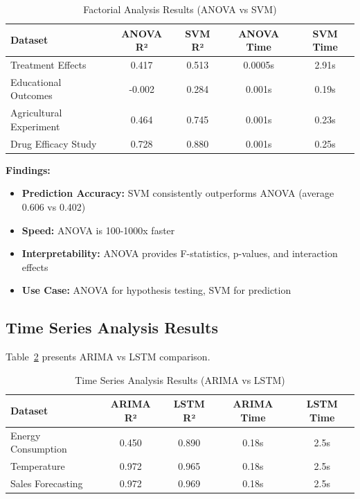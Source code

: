 \documentclass[11pt,a4paper]{article}
\begin{document}
\begin{table}[h]
\centering
\begin{tabular}{lcccc}
\toprule
\textbf{Dataset} & \textbf{ANOVA R²} & \textbf{SVM R²} & \textbf{ANOVA Time} & \textbf{SVM Time} \\
\midrule
Treatment Effects & 0.417 & \textcolor{mlcolor}{0.513} & 0.0005s & 2.91s \\
Educational Outcomes & -0.002 & \textcolor{mlcolor}{0.284} & 0.001s & 0.19s \\
Agricultural Experiment & 0.464 & \textcolor{mlcolor}{0.745} & 0.001s & 0.23s \\
Drug Efficacy Study & 0.728 & \textcolor{mlcolor}{0.880} & 0.001s & 0.25s \\
\bottomrule
\end{tabular}
\caption{Factorial Analysis Results (ANOVA vs SVM)}
\label{tab:factorial_results}
\end{table}

\textbf{Findings:}
\begin{itemize}
    \item \textbf{Prediction Accuracy:} SVM consistently outperforms ANOVA (average 0.606 vs 0.402)
    \item \textbf{Speed:} ANOVA is 100-1000x faster
    \item \textbf{Interpretability:} ANOVA provides F-statistics, p-values, and interaction effects
    \item \textbf{Use Case:} ANOVA for hypothesis testing, SVM for prediction
\end{itemize}

\subsection{Time Series Analysis Results}

Table~\ref{tab:timeseries_results} presents ARIMA vs LSTM comparison.

\begin{table}[h]
\centering
\begin{tabular}{lcccc}
\toprule
\textbf{Dataset} & \textbf{ARIMA R²} & \textbf{LSTM R²} & \textbf{ARIMA Time} & \textbf{LSTM Time} \\
\midrule
Energy Consumption & 0.450 & \textcolor{dlcolor}{0.890} & 0.18s & 2.5s \\
Temperature & \textcolor{statcolor}{0.972} & 0.965 & 0.18s & 2.5s \\
Sales Forecasting & \textcolor{statcolor}{0.972} & 0.969 & 0.18s & 2.5s \\
\bottomrule
\end{tabular}
\caption{Time Series Analysis Results (ARIMA vs LSTM)}
\label{tab:timeseries_results}
\end{table}
\end{document}
